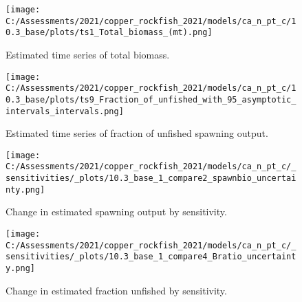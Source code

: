 \documentclass[11pt,
  english,
  a4paper,
]{article}
\begin{document}

\begin{figure}
\centering
\texttt{[image: C:/Assessments/2021/copper\_rockfish\_2021/models/ca\_n\_pt\_c/10.3\_base/plots/ts1\_Total\_biomass\_(mt).png]}
\caption{Estimated time series of total biomass.\label{fig:tot-bio}}
\end{figure}

\tagmcend\tagstructend


\begin{figure}
\centering
\texttt{[image: C:/Assessments/2021/copper\_rockfish\_2021/models/ca\_n\_pt\_c/10.3\_base/plots/ts9\_Fraction\_of\_unfished\_with\_95\_asymptotic\_intervals\_intervals.png]}
\caption{Estimated time series of fraction of unfished spawning output.\label{fig:depl}}
\end{figure}

\tagmcend\tagstructend


\begin{figure}
\centering
\texttt{[image: C:/Assessments/2021/copper\_rockfish\_2021/models/ca\_n\_pt\_c/\_sensitivities/\_plots/10.3\_base\_1\_compare2\_spawnbio\_uncertainty.png]}
\caption{Change in estimated spawning output by sensitivity.\label{fig:sens-ssb-1}}
\end{figure}

\tagmcend\tagstructend


\begin{figure}
\centering
\texttt{[image: C:/Assessments/2021/copper\_rockfish\_2021/models/ca\_n\_pt\_c/\_sensitivities/\_plots/10.3\_base\_1\_compare4\_Bratio\_uncertainty.png]}
\caption{Change in estimated fraction unfished by sensitivity.\label{fig:sens-depl-1}}
\end{figure}

\tagmcend\tagstructend

\end{document}

